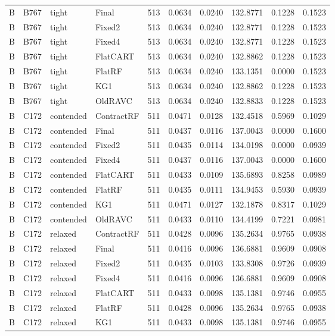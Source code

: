 \begin{longtable}{@{}llllllllll@{}}
B & B767 & tight & Final & 513 & 0.0634 & 0.0240 & 132.8771 & 0.1228 & 0.1523\\
B & B767 & tight & Fixed2 & 513 & 0.0634 & 0.0240 & 132.8771 & 0.1228 & 0.1523\\
B & B767 & tight & Fixed4 & 513 & 0.0634 & 0.0240 & 132.8771 & 0.1228 & 0.1523\\
B & B767 & tight & FlatCART & 513 & 0.0634 & 0.0240 & 132.8862 & 0.1228 & 0.1523\\
B & B767 & tight & FlatRF & 513 & 0.0634 & 0.0240 & 133.1351 & 0.0000 & 0.1523\\
B & B767 & tight & KG1 & 513 & 0.0634 & 0.0240 & 132.8862 & 0.1228 & 0.1523\\
B & B767 & tight & OldRAVC & 513 & 0.0634 & 0.0240 & 132.8833 & 0.1228 & 0.1523\\
B & C172 & contended & ContractRF & 511 & 0.0471 & 0.0128 & 132.4518 & 0.5969 & 0.1029\\
B & C172 & contended & Final & 511 & 0.0437 & 0.0116 & 137.0043 & 0.0000 & 0.1600\\
B & C172 & contended & Fixed2 & 511 & 0.0435 & 0.0114 & 134.0198 & 0.0000 & 0.0939\\
B & C172 & contended & Fixed4 & 511 & 0.0437 & 0.0116 & 137.0043 & 0.0000 & 0.1600\\
B & C172 & contended & FlatCART & 511 & 0.0433 & 0.0109 & 135.6893 & 0.8258 & 0.0989\\
B & C172 & contended & FlatRF & 511 & 0.0435 & 0.0111 & 134.9453 & 0.5930 & 0.0939\\
B & C172 & contended & KG1 & 511 & 0.0471 & 0.0127 & 132.1878 & 0.8317 & 0.1029\\
B & C172 & contended & OldRAVC & 511 & 0.0433 & 0.0110 & 134.4199 & 0.7221 & 0.0981\\
B & C172 & relaxed & ContractRF & 511 & 0.0428 & 0.0096 & 135.2634 & 0.9765 & 0.0938\\
B & C172 & relaxed & Final & 511 & 0.0416 & 0.0096 & 136.6881 & 0.9609 & 0.0908\\
B & C172 & relaxed & Fixed2 & 511 & 0.0435 & 0.0103 & 133.8308 & 0.9726 & 0.0939\\
B & C172 & relaxed & Fixed4 & 511 & 0.0416 & 0.0096 & 136.6881 & 0.9609 & 0.0908\\
B & C172 & relaxed & FlatCART & 511 & 0.0433 & 0.0098 & 135.1381 & 0.9746 & 0.0955\\
B & C172 & relaxed & FlatRF & 511 & 0.0428 & 0.0096 & 135.2634 & 0.9765 & 0.0938\\
B & C172 & relaxed & KG1 & 511 & 0.0433 & 0.0098 & 135.1381 & 0.9746 & 0.0955\\

\end{longtable}
